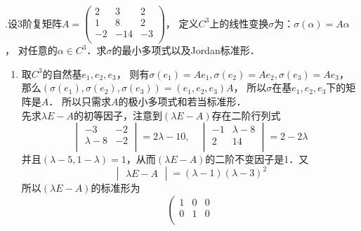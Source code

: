 \documentclass{article}
\begin{document}
\vspace{1ex}
{.}设3阶复矩阵$A=
    \left(
    \begin{matrix}
            2  & 3   & 2  \\
            1  & 8   & 2  \\
            -2 & -14 & -3 \\
        \end{matrix}
    \right)$，
定义$C^3$上的线性变换$\sigma$为：$\sigma(\alpha)=A\alpha$，
对任意的$\alpha\in C^3$．求$\sigma$的最小多项式以及Jordan标准形．
\begin{enumerate}[\qquad 解：]
    \item    取$C^3$的自然基$e_1,e_2,e_3$，
          则有$\sigma(e_1)=Ae_1,\sigma(e_2)=Ae_2,\sigma(e_3)=Ae_3$，
          那么$(\sigma(e_1),\sigma(e_2),\sigma(e_3))=(e_1,e_2,e_3)A$，
          所以$\sigma$在基$e_1,e_2,e_3$下的矩阵是$A$．
          所以只需求$A$的极小多项式和若当标准形．
          \\ 先求$\lambda E-A$的初等因子，注意到$(\lambda E-A)$存在二阶行列式
          \begin{equation*}
              \begin{vmatrix}
                  -3        & -2 \\
                  \lambda-8 & -2 \\
              \end{vmatrix}
              =2\lambda-10,\quad
              \begin{vmatrix}
                  -1 & \lambda-8 \\
                  2  & 14        \\
              \end{vmatrix}
              =2-2\lambda
          \end{equation*}
          并且$(\lambda-5,1-\lambda)=1$，从而$(\lambda E-A)$的二阶不变因子是1．又
          \begin{equation*}
              \begin{vmatrix}\lambda E-A\end{vmatrix}=(\lambda-1)(\lambda-3)^2
          \end{equation*}
          所以$(\lambda E-A)$的标准形为
          \begin{equation*}
              \left(
              \begin{matrix}
                  1 & 0 & 0                        \\
                  0 & 1 & 0                        \\

\end{matrix}
\end{equation*}
\end{enumerate}
\end{document}

